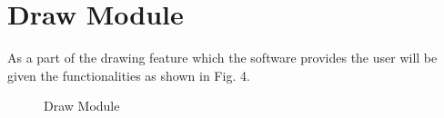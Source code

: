 \documentclass[a4paper,12pt,openany]{report}
\begin{document}
\chapter*{Draw Module}
As a part of the drawing feature which the software provides the user will be given the functionalities as shown in Fig. 4.
\begin{figure}[h]
	\centering
	\caption{Draw Module}
\end{figure}
\end{document}
